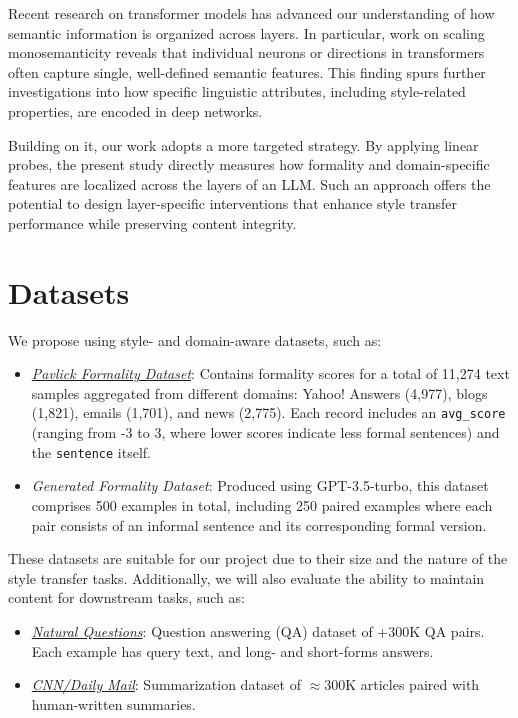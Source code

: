 \documentclass[twocolumn]{article}
\begin{document}
Recent research on transformer models has advanced our understanding of how semantic information is organized across layers. In particular, work on scaling monosemanticity \citep{monosemanticity2024} reveals that individual neurons or directions in transformers often capture single, well-defined semantic features. This finding spurs further investigations into how specific linguistic attributes, including style-related properties, are encoded in deep networks.

Building on it, our work adopts a more targeted strategy. By applying linear probes, the present study directly measures how formality and domain-specific features are localized across the layers of an LLM. Such an approach offers the potential to design layer-specific interventions that enhance style transfer performance while preserving content integrity.

\section{Datasets}

We propose using style- and domain-aware datasets, such as:

\begin{itemize}
    \item \href{https://huggingface.co/datasets/osyvokon/pavlick-formality-scores}{\textit{Pavlick Formality Dataset}}: Contains formality scores for a total of 11,274 text samples aggregated from different domains: Yahoo! Answers (4,977), blogs (1,821), emails (1,701), and news (2,775). Each record includes an \texttt{avg\_score} (ranging from -3 to 3, where lower scores indicate less formal sentences) and the \texttt{sentence} itself.
    \item \textit{Generated Formality Dataset}: Produced using GPT-3.5-turbo, this dataset comprises 500 examples in total, including 250 paired examples where each pair consists of an informal sentence and its corresponding formal version.
\end{itemize}

These datasets are suitable for our project due to their size and the nature of the style transfer tasks. Additionally, we will also evaluate the ability to maintain content for downstream tasks, such as:

\begin{itemize}
    \item \href{https://ai.google.com/research/NaturalQuestions}{\textit{Natural Questions}}: Question answering (QA) dataset of +300K QA pairs. Each example has query text, and long- and short-forms answers.
    \item \href{https://github.com/abisee/cnn-dailymail}{\textit{CNN/Daily Mail}}: Summarization dataset of $\approx$300K articles paired with human-written summaries.
\end{itemize}
\end{document}
